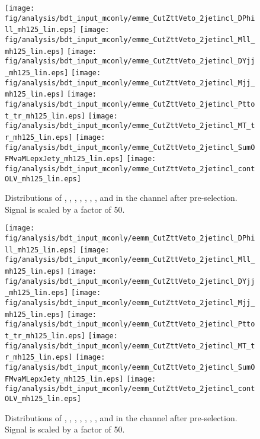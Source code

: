 \begin{figure}[hb!]
  \centering
   \texttt{[image: fig/analysis/bdt\_input\_mconly/emme\_CutZttVeto\_2jetincl\_DPhill\_mh125\_lin.eps]}
   \texttt{[image: fig/analysis/bdt\_input\_mconly/emme\_CutZttVeto\_2jetincl\_Mll\_mh125\_lin.eps]}
   \texttt{[image: fig/analysis/bdt\_input\_mconly/emme\_CutZttVeto\_2jetincl\_DYjj\_mh125\_lin.eps]}
   \texttt{[image: fig/analysis/bdt\_input\_mconly/emme\_CutZttVeto\_2jetincl\_Mjj\_mh125\_lin.eps]}
   \texttt{[image: fig/analysis/bdt\_input\_mconly/emme\_CutZttVeto\_2jetincl\_Pttot\_tr\_mh125\_lin.eps]}
   \texttt{[image: fig/analysis/bdt\_input\_mconly/emme\_CutZttVeto\_2jetincl\_MT\_tr\_mh125\_lin.eps]}
   \texttt{[image: fig/analysis/bdt\_input\_mconly/emme\_CutZttVeto\_2jetincl\_SumOFMvaMLepxJety\_mh125\_lin.eps]}
   \texttt{[image: fig/analysis/bdt\_input\_mconly/emme\_CutZttVeto\_2jetincl\_contOLV\_mh125\_lin.eps]}
   \caption{Distributions
   of \dphill, \mll, \dyjj, \mjj, \pTtot, \mT, \SumMlj, and \lepEtaCent
   in the \emme channel after pre-selection. Signal is scaled by a
   factor of 50.}
  \label{chap:analysis:fig:bdt_inputs_mconly_df}
\end{figure}

\begin{figure}[hb!]
  \centering
   \texttt{[image: fig/analysis/bdt\_input\_mconly/eemm\_CutZttVeto\_2jetincl\_DPhill\_mh125\_lin.eps]}
   \texttt{[image: fig/analysis/bdt\_input\_mconly/eemm\_CutZttVeto\_2jetincl\_Mll\_mh125\_lin.eps]}
   \texttt{[image: fig/analysis/bdt\_input\_mconly/eemm\_CutZttVeto\_2jetincl\_DYjj\_mh125\_lin.eps]}
   \texttt{[image: fig/analysis/bdt\_input\_mconly/eemm\_CutZttVeto\_2jetincl\_Mjj\_mh125\_lin.eps]}
   \texttt{[image: fig/analysis/bdt\_input\_mconly/eemm\_CutZttVeto\_2jetincl\_Pttot\_tr\_mh125\_lin.eps]}
   \texttt{[image: fig/analysis/bdt\_input\_mconly/eemm\_CutZttVeto\_2jetincl\_MT\_tr\_mh125\_lin.eps]}
   \texttt{[image: fig/analysis/bdt\_input\_mconly/eemm\_CutZttVeto\_2jetincl\_SumOFMvaMLepxJety\_mh125\_lin.eps]}
   \texttt{[image: fig/analysis/bdt\_input\_mconly/eemm\_CutZttVeto\_2jetincl\_contOLV\_mh125\_lin.eps]}
   \caption{Distributions
   of \dphill, \mll, \dyjj, \mjj, \pTtot, \mT, \SumMlj, and \lepEtaCent
   in the \eemm channel after pre-selection. Signal is scaled by a
   factor of 50.}
  \label{chap:analysis:fig:bdt_inputs_mconly_sf}
\end{figure}


